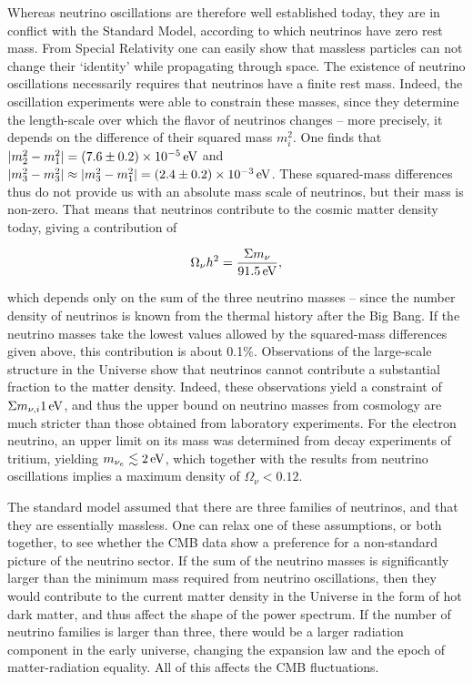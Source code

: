 \documentclass[a4paper,11pt]{article}
\begin{document}
{\noindent}Whereas neutrino oscillations are therefore well established today, they are in conflict with the Standard Model, according to which neutrinos have zero rest mass. From Special Relativity one can easily show that massless particles can not change their `identity' while propagating through space. The existence of neutrino oscillations necessarily requires that neutrinos have a finite rest mass. Indeed, the oscillation experiments were able to constrain these masses, since they determine the length-scale over which the flavor of neutrinos changes -- more precisely, it depends on the difference of their squared mass $m_i^2$. One finds that $\lvert m_2^2-m_1^2\rvert=(7.6\pm0.2)\times10^{-5}\,{\rm eV}$ and $\lvert m_3^2-m_3^2\rvert \approx \lvert m_3^2-m_1^2\rvert =(2.4\pm0.2)\times10^{-3}\,{\rm eV}$. These squared-mass differences thus do not provide us with an absolute mass scale of neutrinos, but their mass is non-zero. That means that neutrinos contribute to the cosmic matter density today, giving a contribution of

\begin{align*}
    \Omega_\nu h^2 = \frac{\Sigma m_\nu}{91.5\,{\rm eV}},
\end{align*}

{\noindent}which depends only on the sum of the three neutrino masses -- since the number density of neutrinos is known from the thermal history after the Big Bang. If the neutrino masses take the lowest values allowed by the squared-mass differences given above, this contribution is about 0.1\%. Observations of the large-scale structure in the Universe show that neutrinos cannot contribute a substantial fraction to the matter density. Indeed, these observations yield a constraint of $\Sigma m_{\nu,i}1\,{\rm eV}$, and thus the upper bound on neutrino masses from cosmology are much stricter than those obtained from laboratory experiments. For the electron neutrino, an upper limit on its mass was determined from decay experiments of tritium, yielding $m_{\nu_e}\lesssim2\,{\rm eV}$, which together with the results from neutrino oscillations implies a maximum density of $\Omega_\nu<0.12$.


{\noindent}The standard model assumed that there are three families of neutrinos, and that they are essentially massless. One can relax one of these assumptions, or both together, to see whether the CMB data show a preference for a non-standard picture of the neutrino sector. If the sum of the neutrino masses is significantly larger than the minimum mass required from neutrino oscillations, then they would contribute to the current matter density in the Universe in the form of hot dark matter, and thus affect the shape of the power spectrum. If the number of neutrino families is larger than three, there would be a larger radiation component in the early universe, changing the expansion law and the epoch of matter-radiation equality. All of this affects the CMB fluctuations.
\end{document}
